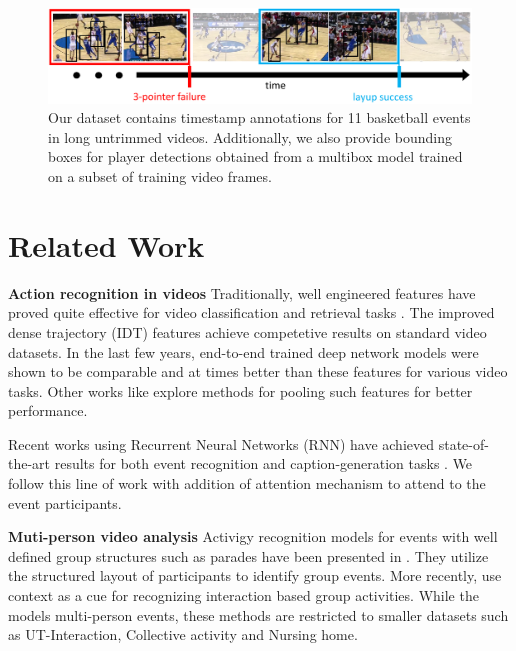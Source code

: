 
\begin{figure}[ht!]
  \includegraphics[width=6.5 in]{images/dataset_figure_cropped.pdf}
  \caption{Our dataset contains timestamp annotations for 11 basketball events
    in long untrimmed videos. Additionally, we also provide bounding boxes for player
    detections obtained from a multibox model trained on a subset of training
  video frames.}
\end{figure}



\section{Related Work}

\noindent \textbf{Action recognition in videos}
Traditionally, well engineered features have proved quite effective for video
classification and retrieval tasks
\cite{Dalal_ECCV06,Jain_CVPR13,Jiang_ECCV12,Laptev_CVPR08,
Niebels_ECCV10,Oh_MVA14,Oneata_ICCV13,Peng_ECCV14,Sadanand_CVPR12,Wang_BMVC09,Wang_CVPR11}.
The improved dense trajectory (IDT) features \cite{Wang_CVPR11} achieve
competetive results on standard video datasets.  In the last few years,
end-to-end trained deep network models
\cite{Ji_PAMI13,Karpathy_CVPR14,Simonyan_2014,Tran_arxiv14} were shown to be comparable and
at times better than these features for various video tasks.  Other works like
\cite{Xu_2015,Zha_2015,Wang_arxiv15} explore methods for pooling such
features for better performance.

Recent works using Recurrent Neural Networks (RNN) have achieved
state-of-the-art results for both event recognition and caption-generation
tasks \cite{Donahue_arxiv14,Ng_arxiv15,Srivastava_2015,Yao_arxiv15}.
We follow this line of work with addition of attention mechanism
to attend to the event participants.

\noindent \textbf{Muti-person video analysis}
Activigy recognition models for events with well defined group structures such
as parades have been presented in
\cite{Vaswani_CVPR03,Intille_CVIU01,Moore_AAAI02,Khan_ACM05}.  They utilize the
structured layout of participants to identify group events. More
recently, \cite{Lan_PAMI12,Choi_ICCV09,Khodabandeh_arxiv15} use context as a
cue for recognizing interaction based group activities.  While the models
multi-person events, these methods are restricted to smaller
datasets such as UT-Interaction\cite{Ryoo_10}, Collective activity
\cite{Choi_ICCV09} and Nursing home\cite{Lan_PAMI12}.

